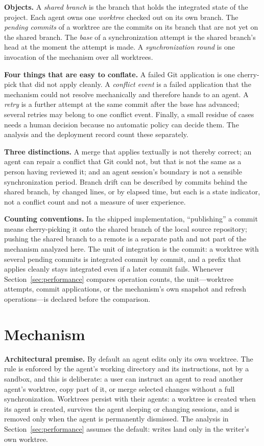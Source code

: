 \documentclass[pdflatex,sn-mathphys-ay]{sn-jnl}
\theoremstyle{thmstyleone}
\theoremstyle{thmstylethree}
\begin{document}
\textbf{Objects.} A \emph{shared branch} is the branch that holds the integrated state of the project. Each agent owns one \emph{worktree} checked out on its own branch. The \emph{pending commits} of a worktree are the commits on its branch that are not yet on the shared branch. The \emph{base} of a synchronization attempt is the shared branch's head at the moment the attempt is made. A \emph{synchronization round} is one invocation of the mechanism over all worktrees.

\textbf{Four things that are easy to conflate.} A failed Git application is one cherry-pick that did not apply cleanly. A \emph{conflict event} is a failed application that the mechanism could not resolve mechanically and therefore hands to an agent. A \emph{retry} is a further attempt at the same commit after the base has advanced; several retries may belong to one conflict event. Finally, a small residue of cases needs a human decision because no automatic policy can decide them. The analysis and the deployment record count these separately.

\textbf{Three distinctions.} A merge that applies textually is not thereby correct; an agent can repair a conflict that Git could not, but that is not the same as a person having reviewed it; and an agent session's boundary is not a sensible synchronization period. Branch drift can be described by commits behind the shared branch, by changed lines, or by elapsed time, but each is a state indicator, not a conflict count and not a measure of user experience.

\textbf{Counting conventions.} In the shipped implementation, ``publishing'' a commit means cherry-picking it onto the shared branch of the local source repository; pushing the shared branch to a remote is a separate path and not part of the mechanism analyzed here. The unit of integration is the commit: a worktree with several pending commits is integrated commit by commit, and a prefix that applies cleanly stays integrated even if a later commit fails. Whenever Section~\ref{sec:performance} compares operation counts, the unit---worktree attempts, commit applications, or the mechanism's own snapshot and refresh operations---is declared before the comparison.
\section{Mechanism}\label{sec:mechanism}

\textbf{Architectural premise.} By default an agent edits only its own worktree. The rule is enforced by the agent's working directory and its instructions, not by a sandbox, and this is deliberate: a user can instruct an agent to read another agent's worktree, copy part of it, or merge selected changes without a full synchronization. Worktrees persist with their agents: a worktree is created when its agent is created, survives the agent sleeping or changing sessions, and is removed only when the agent is permanently dismissed. The analysis in Section~\ref{sec:performance} assumes the default: writes land only in the writer's own worktree.
\end{document}
